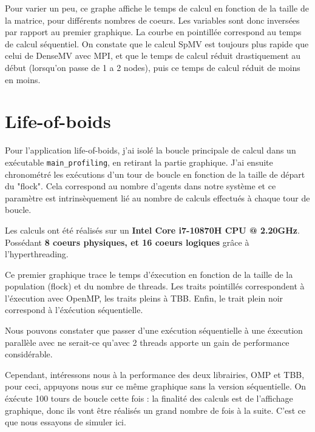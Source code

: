 \documentclass[10pt,twocolumn,letterpaper]{article}
\def\code#1{\texttt{#1}}
\begin{document}
Pour varier un peu, ce graphe affiche le temps de calcul en fonction de la taille de la matrice, pour
différents nombres de coeurs.
Les variables sont donc inversées par rapport au premier graphique. 
La courbe en pointillée correspond au temps de calcul séquentiel. 
On constate que le calcul SpMV est toujours plus rapide que celui de DenseMV avec MPI, et que le temps de calcul réduit drastiquement au début
(lorsqu'on passe de 1 a 2 nodes), puis ce temps de calcul réduit de moins en moins.

\section{Life-of-boids}

Pour l'application life-of-boids, j'ai isolé la boucle principale de calcul dans un exécutable \code{main\_profiling}, en retirant la partie graphique.
J'ai ensuite chronométré les exécutions d'un tour de boucle en fonction de la taille de départ du "flock".
Cela correspond au nombre d'agents dans notre système et ce paramètre est intrinsèquement lié au nombre de calculs effectués à chaque tour de boucle.

Les calculs ont été réalisés sur un \textbf{Intel Core i7-10870H CPU @ 2.20GHz}. Possédant \textbf{8 coeurs physiques, et 16 coeurs logiques} grâce à l'hyperthreading.

Ce premier graphique trace le temps d'éxecution en fonction de la taille de la population (flock) et du nombre de threads.
Les traits pointillés correspondent à l'éxecution avec OpenMP, les traits pleins à TBB. Enfin, le trait plein noir correspond à l'éxécution séquentielle.


Nous pouvons constater que passer d'une exécution séquentielle à une éxecution parallèle avec ne serait-ce qu'avec 2 threads apporte un gain de performance considérable.

Cependant, intéressons nous à la performance des deux librairies, OMP et TBB, pour ceci, appuyons nous sur ce même graphique sans la version séquentielle.
On éxécute 100 tours de boucle cette fois : la finalité des calculs est de l'affichage graphique, donc ils vont être réalisés un grand nombre de fois à la suite.
C'est ce que nous essayons de simuler ici.
\end{document}
